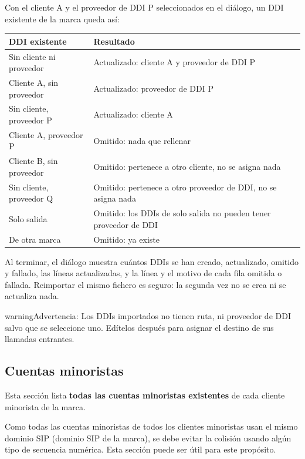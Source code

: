 \documentclass[letterpaper,10pt,spanish]{sphinxmanual}
\begin{document}
Con el cliente A y el proveedor de DDI P seleccionados en el diálogo, un DDI existente de la marca queda así:

\noindent\begin{tabulary}{\linewidth}{|L|L|}
\hline
\textsf{\relax 
DDI existente
\unskip}\relax &\textsf{\relax 
Resultado
\unskip}\relax \\
\hline
Sin cliente ni proveedor
&
Actualizado: cliente A y proveedor de DDI P
\\
\hline
Cliente A, sin proveedor
&
Actualizado: proveedor de DDI P
\\
\hline
Sin cliente, proveedor P
&
Actualizado: cliente A
\\
\hline
Cliente A, proveedor P
&
Omitido: nada que rellenar
\\
\hline
Cliente B, sin proveedor
&
Omitido: pertenece a otro cliente, no se asigna nada
\\
\hline
Sin cliente, proveedor Q
&
Omitido: pertenece a otro proveedor de DDI, no se asigna nada
\\
\hline
Solo salida
&
Omitido: los DDIs de solo salida no pueden tener proveedor de DDI
\\
\hline
De otra marca
&
Omitido: ya existe
\\
\hline\end{tabulary}


Al terminar, el diálogo muestra cuántos DDIs se han creado, actualizado, omitido y fallado, las líneas actualizadas, y la línea y el motivo de cada fila omitida o fallada. Reimportar el mismo fichero es seguro: la segunda vez no se crea ni se actualiza nada.

\begin{notice}{warning}{Advertencia:}
Los DDIs importados no tienen ruta, ni proveedor de DDI salvo que se seleccione uno. Edítelos después para asignar el destino de sus llamadas entrantes.
\end{notice}


\subsection{Cuentas minoristas}
\label{administration_portal/brand/views/retail_accounts::doc}\label{administration_portal/brand/views/retail_accounts:retail-accounts}
Esta sección lista \textbf{todas las cuentas minoristas existentes} de cada cliente minorista de la marca.

Como todas las cuentas minoristas de todos los clientes minoristas usan el mismo dominio SIP (dominio SIP de la marca), se debe evitar la colisión usando algún tipo de secuencia numérica. Esta sección puede ser útil para este propósito.
\end{document}
